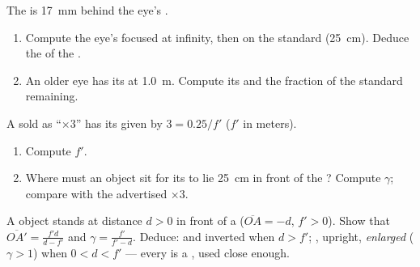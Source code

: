 \begin{exercise}[$\star\star\star$]\label{exo:g11:lenses-and-eye:13}
The  is \qty{17}{mm} behind the eye's .
\begin{enumerate}
  \item Compute the eye's  focused at infinity, then on the
        standard  (\qty{25}{cm}). Deduce the 
         of the .
  \item An older eye has its  at \qty{1.0}{m}. Compute its
         and the fraction of the standard  remaining.
\end{enumerate}
\end{exercise}

\begin{exercise}[$\star\star\star$]\label{exo:g11:lenses-and-eye:14}
A  sold as ``$\times 3$'' has its  given by
$3 = 0.25/f'$ ($f'$ in meters).
\begin{enumerate}
  \item Compute $f'$.
  \item Where must an object sit for its  to lie
        \qty{25}{cm} in front of the ? Compute $\gamma$; compare
        with the advertised $\times 3$.
\end{enumerate}
\end{exercise}

\begin{exercise}[$\star\star\star$]\label{exo:g11:lenses-and-eye:15}
A  object stands at distance $d > 0$ in front of a 
($\overline{OA} = -d$, $f' > 0$). Show that
$\overline{OA'} = \frac{f'd}{d - f'}$ and
$\gamma = \frac{f'}{f' - d}$. Deduce:  and inverted when $d > f'$;
, upright, \emph{enlarged} ($\gamma > 1$) when $0 < d < f'$ ---
every  is a , used close enough.
\end{exercise}

